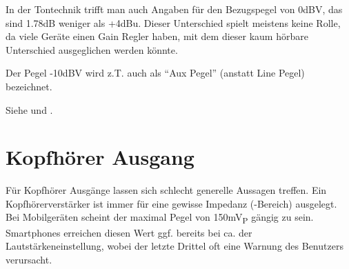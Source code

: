 ﻿\documentclass[9pt,german]{article}
\begin{document}
In der Tontechnik trifft man auch Angaben für den Bezugspegel von 0dBV, das sind 1.78dB weniger als +4dBu.
Dieser Unterschied spielt meistens keine Rolle, da viele Geräte einen Gain Regler haben, mit dem dieser kaum
hörbare Unterschied ausgeglichen werden könnte.

Der Pegel -10dBV wird z.T. auch als ``Aux Pegel'' (anstatt Line Pegel) bezeichnet.

{\small Siehe \cite{kirstein} und \cite{shure}.}



\section*{Kopfhörer Ausgang}

Für Kopfhörer Ausgänge lassen sich schlecht generelle Aussagen treffen. Ein Kopfhörerverstärker ist immer für
eine gewisse Impedanz (-Bereich) ausgelegt.
\\

Bei Mobilgeräten scheint der maximal Pegel von 150mV\textsubscript{P} gängig zu sein. Smartphones erreichen
diesen Wert ggf. bereits bei ca.  der Lautstärkeneinstellung, wobei der letzte Drittel oft eine
Warnung des Benutzers verursacht.



\printbibliography[title=Quellen]
\end{document}
